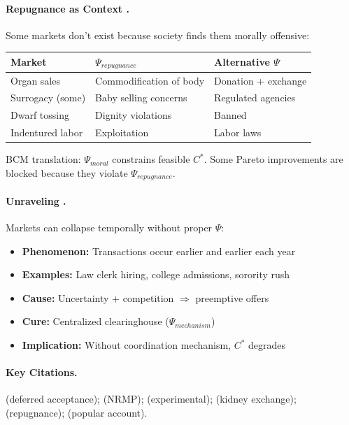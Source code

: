 \paragraph{Repugnance as Context \citep{roth2007repugnance}.}
Some markets don't exist because society finds them morally offensive:
\begin{center}
\small
\begin{tabular}{@{}lll@{}}
\toprule
\textbf{Market} & \textbf{$\Psi_{repugnance}$} & \textbf{Alternative $\Psi$} \\
\midrule
Organ sales & Commodification of body & Donation + exchange \\
Surrogacy (some) & Baby selling concerns & Regulated agencies \\
Dwarf tossing & Dignity violations & Banned \\
Indentured labor & Exploitation & Labor laws \\
\bottomrule
\end{tabular}
\end{center}
BCM translation: $\Psi_{moral}$ constrains feasible $C^*$. Some Pareto improvements
are blocked because they violate $\Psi_{repugnance}$.

\paragraph{Unraveling \citep{roth1994jumping}.}
Markets can collapse temporally without proper $\Psi$:
\begin{itemize}[nosep]
    \item \textbf{Phenomenon:} Transactions occur earlier and earlier each year
    \item \textbf{Examples:} Law clerk hiring, college admissions, sorority rush
    \item \textbf{Cause:} Uncertainty + competition $\Rightarrow$ preemptive offers
    \item \textbf{Cure:} Centralized clearinghouse ($\Psi_{mechanism}$)
    \item \textbf{Implication:} Without coordination mechanism, $C^*$ degrades
\end{itemize}

\paragraph{Key Citations.}
\citet{gale1962college} (deferred acceptance); \citet{roth1984evolution} (NRMP);
\citet{roth1991game} (experimental); \citet{roth2004kidney} (kidney exchange);
\citet{roth2007repugnance} (repugnance); \citet{roth2015who} (popular account).

